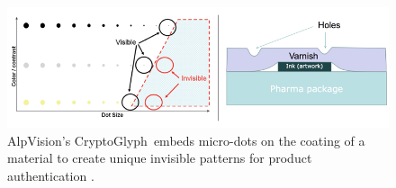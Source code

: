 \documentclass[thesis.tex]{subfiles}
\begin{document}
\begin{figure}
\centering \includegraphics[width=\textwidth]{images/existing_solutions/cryptoglyph}
\vspace{-8mm}
\caption{AlpVision's CryptoGlyph\textregistered\ embeds micro-dots on the coating of a material to create unique invisible patterns for product authentication \cite{alpvision}. \label{figure:alpvision}}
\vspace{-5mm}
\end{figure}
\end{document}
